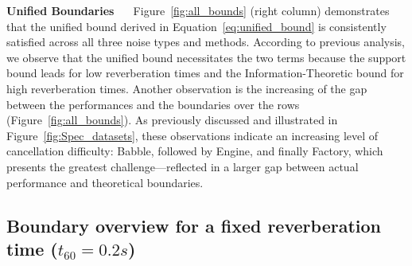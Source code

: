 \documentclass{article}
\begin{document}
\textbf{Unified Boundaries~~~}Figure~\ref{fig:all_bounds} (right column) demonstrates that the unified bound derived in Equation~\ref{eq:unified_bound} is consistently satisfied across all three noise types and methods. According to previous analysis, we observe that the unified bound necessitates the two terms because the support bound leads for low reverberation times and the Information-Theoretic bound for high reverberation times. Another observation is the increasing of the gap between the performances and the boundaries over the rows (Figure~\ref{fig:all_bounds}). As previously discussed and illustrated in Figure~\ref{fig:Spec_datasets}, these observations indicate an increasing level of cancellation difficulty: Babble, followed by Engine, and finally Factory, which presents the greatest challenge—reflected in a larger gap between actual performance and theoretical boundaries.


\subsection{Boundary overview for a fixed reverberation time ($t_{60}=0.2s$)}
\end{document}
